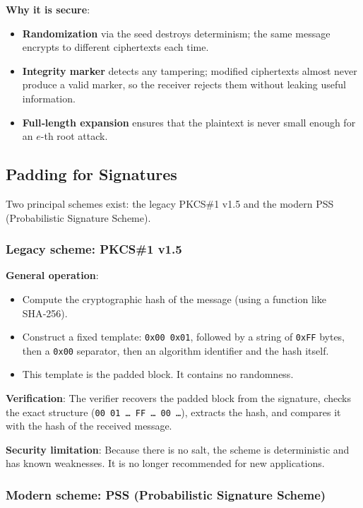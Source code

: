 \noindent\textbf{Why it is secure}:
\begin{itemize}
\item \textbf{Randomization} via the seed destroys determinism; the same message encrypts to different ciphertexts each time.
\item \textbf{Integrity marker} detects any tampering; modified ciphertexts almost never produce a valid marker, so the receiver rejects them without leaking useful information.
\item \textbf{Full‑length expansion} ensures that the plaintext is never small enough for an \(e\)-th root attack.
\end{itemize}

\subsection{Padding for Signatures}

Two principal schemes exist: the legacy PKCS\#1 v1.5 and the modern PSS (Probabilistic Signature Scheme).

\subsubsection{Legacy scheme: PKCS\#1 v1.5}

\noindent\textbf{General operation}:
\begin{itemize}
\item Compute the cryptographic hash of the message (using a function like SHA‑256).
\item Construct a fixed template: \texttt{0x00 0x01}, followed by a string of \texttt{0xFF} bytes, then a \texttt{0x00} separator, then an algorithm identifier and the hash itself.
\item This template is the padded block. It contains no randomness.
\end{itemize}

\noindent\textbf{Verification}: The verifier recovers the padded block from the signature, checks the exact structure (\texttt{00 01 … FF … 00 …}), extracts the hash, and compares it with the hash of the received message.

\noindent\textbf{Security limitation}: Because there is no salt, the scheme is deterministic and has known weaknesses. It is no longer recommended for new applications.

\subsubsection{Modern scheme: PSS (Probabilistic Signature Scheme)}

